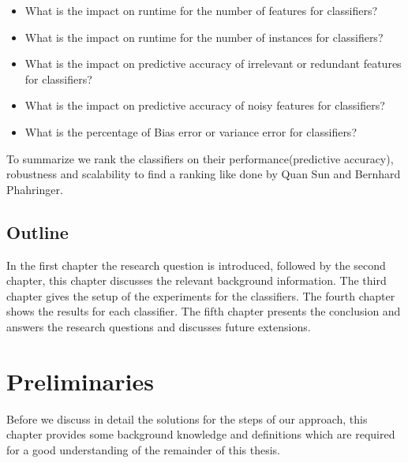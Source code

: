 \documentclass[a4paper,10pt]{article}
\begin{document}

\begin{itemize}
	\item What is the impact on runtime for the number of features for classifiers?
	\item What is the impact on runtime for the number of instances for classifiers?
	\item What is the impact on predictive accuracy of irrelevant or redundant features for classifiers?
	\item What is the impact on predictive accuracy of noisy features for classifiers?
	\item What is the percentage of Bias error or variance error for classifiers?
\end{itemize}

To summarize we rank the classifiers on their performance(predictive accuracy), robustness and scalability to find a ranking like done by Quan Sun and Bernhard Phahringer\cite{ranking}.




\subsection{Outline}
In the first chapter the research question is introduced, followed by the second chapter, this chapter discusses the relevant background information. The third chapter gives the setup of the experiments for the classifiers. The fourth chapter shows the results for each classifier. The fifth chapter presents the conclusion and answers the research questions and discusses future extensions.

\newpage


\section{Preliminaries} \label{Chapter2}
Before we discuss in detail the solutions for the steps of our approach, this chapter provides
some background knowledge and definitions which are required for a good understanding of
the remainder of this thesis.
\end{document}

